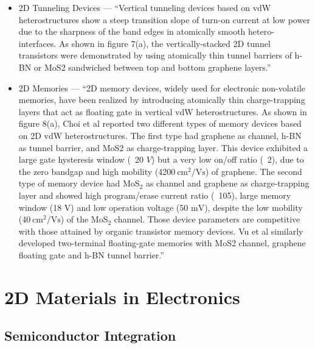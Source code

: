 \documentclass[conference]{IEEEtran}
\begin{document}
\begin{itemize}

  \item 2D Tunneling Devices — ``Vertical tunneling devices based on vdW heterostructures show a steep transition slope of turn-on current at low power due to the sharpness of the band edges in atomically smooth hetero-interfaces. As shown in figure 7(a), the vertically-stacked 2D tunnel transistors were demonstrated by using atomically thin tunnel barriers of h-BN or MoS2 sandwiched between top and bottom graphene layers.''

  \item 2D Memories — ``2D memory devices, widely used for electronic non-volatile memories, have been realized by introducing atomically thin charge-trapping layers that act as floating gate in vertical vdW heterostructures. As shown in figure 8(a), Choi et al reported two different types of memory devices based on 2D vdW heterostructures. The first type had graphene as channel, h-BN as tunnel barrier, and MoS2 as charge-trapping layer. This device exhibited a large gate hysteresis window (~20 $\si{V}$) but a very low on/off ratio (~2), due to the zero bandgap and high mobility (4200 $\si{\centi\meter\squared\per\volt\second}$) of graphene. The second type of memory device had MoS$_2$ as channel and graphene as charge-trapping layer and showed high program/erase current ratio (~105), large memory window (18 $\si{\volt}$) and low operation voltage (50 $\si{\milli\volt}$), despite the low mobility (40 $\si{\centi\meter\squared\per\volt\second}$) of the MoS$_2$ channel. Those device parameters are competitive with those attained by organic transistor memory devices. Vu et al similarly developed two-terminal floating-gate memories with MoS2 channel, graphene floating gate and h-BN tunnel barrier.''

\end{itemize}

\section{2D Materials in Electronics}

\subsection{Semiconductor Integration}
\end{document}
